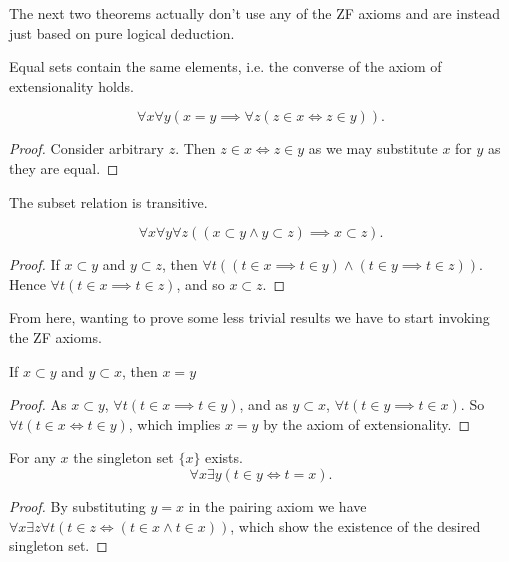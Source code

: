 \documentclass[]{article}
\begin{document}
The next two theorems actually don't use any of the ZF axioms and are instead just based on pure logical deduction.

\begin{thm} \label{thm:sameelmsamesets}
	Equal sets contain the same elements, i.e. the converse of the axiom of extensionality holds.

	\[
			\forall x \forall y (x = y \implies \forall z (z \in x \iff z \in y))
	.\] 
\end{thm}

\begin{proof}
	Consider arbitrary $z$. Then $z \in x \iff z \in y$ as we may substitute $x$ for $y$ as they are equal.
\end{proof}

\begin{thm} \label{thm:transsubsets}
	The subset relation is transitive.

	\[
			\forall x \forall y \forall z ((x \subset y \land y \subset z) \implies x \subset z)
	.\] 
\end{thm}

\begin{proof}
		If $x \subset y$ and $y \subset z$, then $\forall t ((t \in x \implies t \in y) \land (t \in y \implies t \in z))$. Hence $\forall t (t \in x \implies t \in z)$, and so $x \subset z$.
\end{proof}

From here, wanting to prove some less trivial results we have to start invoking the ZF axioms.

\begin{thm} \label{thm:mutalsubsets}
	If $x \subset y$ and $y \subset x$, then $x = y$
\end{thm}

\begin{proof}
		As $x \subset y$, $\forall t (t \in x \implies t \in y)$, and as $y \subset x$, $\forall t(t \in y \implies t \in x)$. So $\forall t (t \in x \iff t \in y)$, which implies $x = y$ by the axiom of extensionality.
\end{proof}

\begin{thm} \label{thm:singleton}
		For any $x$ the singleton set $\{x\}$ exists. 
		\[
				\forall x \exists y(t \in y \iff t = x)
		.\] 
\end{thm}

\begin{proof}
		By substituting $y = x$ in the pairing axiom we have $\forall x \exists z \forall t(t \in z \iff (t \in x \land t \in x))$, which show the existence of the desired singleton set.
\end{proof}
\end{document}
